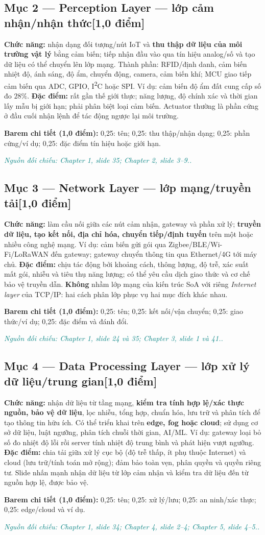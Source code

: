 \documentclass[11pt,a4paper]{article}
\newcommand{\pointpart}[2]{\subsection*{Mục #1 --- #2\hfill\normalsize\color{teal}[1,0 điểm]}}
\newcommand{\src}[1]{\par\noindent\textcolor{teal}{\footnotesize\textit{Nguồn đối chiếu: #1.}}\par}
\newcommand{\scoring}[1]{\par\noindent\textbf{Barem chi tiết (1,0 điểm):} #1\par}
\newcommand{\kw}[1]{\textbf{#1}}
\begin{document}
\pointpart{2}{Perception Layer --- lớp cảm nhận/nhận thức}
\kw{Chức năng:} nhận dạng đối tượng/nút IoT và \kw{thu thập dữ liệu của môi trường vật lý} bằng cảm biến; tiếp nhận đầu vào qua tín hiệu analog/số và tạo dữ liệu có thể chuyển lên lớp mạng. Thành phần: RFID/định danh, cảm biến nhiệt độ, ánh sáng, độ ẩm, chuyển động, camera, cảm biến khí; MCU giao tiếp cảm biến qua ADC, GPIO, I\textsuperscript{2}C hoặc SPI. Ví dụ: cảm biến độ ẩm đất cung cấp số đo $28\%$. \kw{Đặc điểm:} rất gần thế giới thực; năng lượng, độ chính xác và thời gian lấy mẫu bị giới hạn; phải phân biệt loại cảm biến. Actuator thường là phần cứng ở đầu cuối nhận lệnh để tác động ngược lại môi trường.
\scoring{0,25: tên; 0,25: thu thập/nhận dạng; 0,25: phần cứng/ví dụ; 0,25: đặc điểm tín hiệu hoặc giới hạn.}
\src{Chapter 1, slide 35; Chapter 2, slide 3--9.}

\pointpart{3}{Network Layer --- lớp mạng/truyền tải}
\kw{Chức năng:} làm cầu nối giữa các nút cảm nhận, gateway và phần xử lý; \kw{truyền dữ liệu, tạo kết nối, địa chỉ hóa, chuyển tiếp/định tuyến} trên một hoặc nhiều công nghệ mạng. Ví dụ: cảm biến gửi gói qua Zigbee/BLE/Wi-Fi/LoRaWAN đến gateway; gateway chuyển thông tin qua Ethernet/4G tới máy chủ. \kw{Đặc điểm:} chịu tác động bởi khoảng cách, thông lượng, độ trễ, xác suất mất gói, nhiễu và tiêu thụ năng lượng; có thể yêu cầu dịch giao thức và cơ chế bảo vệ truyền dẫn. \kw{Không} nhầm lớp mạng của kiến trúc SoA với riêng \emph{Internet layer} của TCP/IP: hai cách phân lớp phục vụ hai mục đích khác nhau.
\scoring{0,25: tên; 0,25: kết nối/vận chuyển; 0,25: giao thức/ví dụ; 0,25: đặc điểm và đánh đổi.}
\src{Chapter 1, slide 24 và 35; Chapter 3, slide 1 và 41.}

\pointpart{4}{Data Processing Layer --- lớp xử lý dữ liệu/trung gian}
\kw{Chức năng:} nhận dữ liệu từ tầng mạng, \kw{kiểm tra tính hợp lệ/xác thực nguồn, bảo vệ dữ liệu}, lọc nhiễu, tổng hợp, chuẩn hóa, lưu trữ và phân tích để tạo thông tin hữu ích. Có thể triển khai trên \kw{edge, fog hoặc cloud}; sử dụng cơ sở dữ liệu, luật ngưỡng, phân tích chuỗi thời gian, AI/ML. Ví dụ: gateway loại bỏ số đo nhiệt độ lỗi rồi server tính nhiệt độ trung bình và phát hiện vượt ngưỡng. \kw{Đặc điểm:} chia tải giữa xử lý cục bộ (độ trễ thấp, ít phụ thuộc Internet) và cloud (lưu trữ/tính toán mở rộng); đảm bảo toàn vẹn, phân quyền và quyền riêng tư. Slide nhấn mạnh nhận dữ liệu từ lớp cảm nhận và kiểm tra dữ liệu đến từ nguồn hợp lệ, được bảo vệ.
\scoring{0,25: tên; 0,25: xử lý/lưu; 0,25: an ninh/xác thực; 0,25: edge/cloud và ví dụ.}
\src{Chapter 1, slide 34; Chapter 4, slide 2--4; Chapter 5, slide 4--5.}
\end{document}

